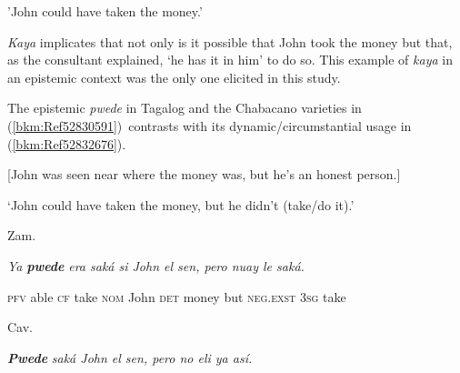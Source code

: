 \begin{stylelsLanginfo}
{}'John could have taken the money.'
\end{stylelsLanginfo}

\begin{styleStandard}
\textit{Kaya} implicates that not only is it possible that John took the money but that, as the consultant explained, ‘he has it in him’ to do so. This example of \textit{kaya} in an epistemic context was the only one elicited in this study.
\end{styleStandard}

\begin{styleStandard}
The epistemic \textit{pwede} in Tagalog and the Chabacano varieties in (\ref{bkm:Ref52830591})\ contrasts with its dynamic/circumstantial usage in (\ref{bkm:Ref52832676}).
\end{styleStandard}

\begin{listWWNumiileveli}
\item 
\begin{stylelsLanginfo}
\label{bkm:Ref52832676}[John was seen near where the money was, but he’s an honest person.]
\end{stylelsLanginfo}
\end{listWWNumiileveli}
\begin{stylelsLanginfo}
‘John could have taken the money, but he didn’t (take/do it).’
\end{stylelsLanginfo}

\begin{listWWNumiileveli}
\item 
\begin{listWWNumiilevelii}
\item 
\begin{stylelsLanginfo}
Zam.
\end{stylelsLanginfo}
\end{listWWNumiilevelii}
\end{listWWNumiileveli}
\begin{stylelsIMT}
\textit{Ya}\textbf{\textit{ pwede}}\textit{ era saká si John el sen, pero nuay le saká.}
\end{stylelsIMT}

\begin{stylelsIMT}
\textsc{pfv} able \textsc{cf} take \textsc{nom} John \textsc{det} money but \textsc{neg}.\textsc{exst} 3\textsc{sg} take
\end{stylelsIMT}

\begin{listWWNumiileveli}
\item 
\begin{listWWNumiilevelii}
\item 
\begin{stylelsLanginfo}
Cav.
\end{stylelsLanginfo}
\end{listWWNumiilevelii}
\end{listWWNumiileveli}
\begin{stylelsIMT}
\textbf{\textit{Pwede}}\textit{ saká John el sen, pero no eli ya así.}
\end{stylelsIMT}

